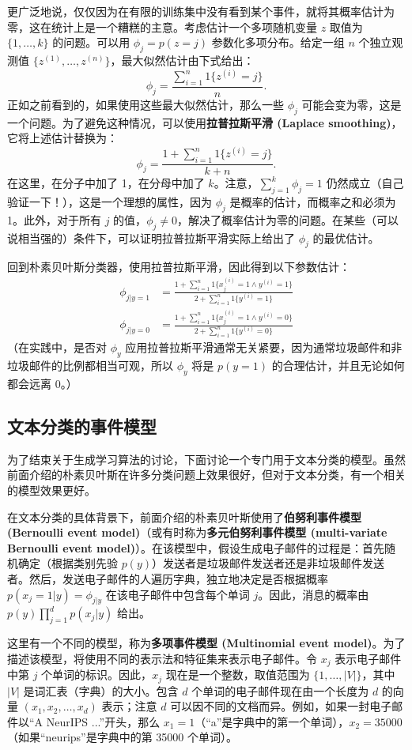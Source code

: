 更广泛地说，仅仅因为在有限的训练集中没有看到某个事件，就将其概率估计为零，这在统计上是一个糟糕的主意。考虑估计一个多项随机变量 $z$ 取值为 $\{1, \dots, k\}$ 的问题。可以用 $\phi_j = p(z=j)$ 参数化多项分布。给定一组 $n$ 个独立观测值 $\{z^{(1)}, \dots, z^{(n)}\}$，最大似然估计由下式给出：
\[
    \phi_j = \frac{\sum_{i=1}^n {1}\{z^{(i)} = j\}}{n}.
\]
正如之前看到的，如果使用这些最大似然估计，那么一些 $\phi_j$ 可能会变为零，这是一个问题。为了避免这种情况，可以使用\textbf{拉普拉斯平滑 (Laplace smoothing)}，它将上述估计替换为：
\[
    \phi_j = \frac{1 + \sum_{i=1}^n {1}\{z^{(i)} = j\}}{k + n}.
\]
在这里，在分子中加了 1，在分母中加了 $k$。注意，$\sum_{j=1}^k \phi_j = 1$ 仍然成立（自己验证一下！），这是一个理想的属性，因为 $\phi_j$ 是概率的估计，而概率之和必须为 1。此外，对于所有 $j$ 的值，$\phi_j \ne 0$，解决了概率估计为零的问题。在某些（可以说相当强的）条件下，可以证明拉普拉斯平滑实际上给出了 $\phi_j$ 的最优估计。

回到朴素贝叶斯分类器，使用拉普拉斯平滑，因此得到以下参数估计：
\begin{align*} \phi_{j|y=1} &= \frac{1 + \sum_{i=1}^n {1}\{x_j^{(i)} = 1 \wedge y^{(i)} = 1\}}{2 + \sum_{i=1}^n {1}\{y^{(i)} = 1\}} \\ \phi_{j|y=0} &= \frac{1 + \sum_{i=1}^n {1}\{x_j^{(i)} = 1 \wedge y^{(i)} = 0\}}{2 + \sum_{i=1}^n {1}\{y^{(i)} = 0\}} \end{align*}
（在实践中，是否对 $\phi_y$ 应用拉普拉斯平滑通常无关紧要，因为通常垃圾邮件和非垃圾邮件的比例都相当可观，所以 $\phi_y$ 将是 $p(y=1)$ 的合理估计，并且无论如何都会远离 0。）

\subsection{文本分类的事件模型}

为了结束关于生成学习算法的讨论，下面讨论一个专门用于文本分类的模型。虽然前面介绍的朴素贝叶斯在许多分类问题上效果很好，但对于文本分类，有一个相关的模型效果更好。

在文本分类的具体背景下，前面介绍的朴素贝叶斯使用了\textbf{伯努利事件模型 (Bernoulli event model)}（或有时称为\textbf{多元伯努利事件模型 (multi-variate Bernoulli event model)}）。在该模型中，假设生成电子邮件的过程是：首先随机确定（根据类别先验 $p(y)$）发送者是垃圾邮件发送者还是非垃圾邮件发送者。然后，发送电子邮件的人遍历字典，独立地决定是否根据概率 $p(x_j=1|y) = \phi_{j|y}$ 在该电子邮件中包含每个单词 $j$。因此，消息的概率由 $p(y) \prod_{j=1}^d p(x_j|y)$ 给出。

这里有一个不同的模型，称为\textbf{多项事件模型 (Multinomial event model)}。为了描述该模型，将使用不同的表示法和特征集来表示电子邮件。令 $x_j$ 表示电子邮件中第 $j$ 个单词的标识。因此，$x_j$ 现在是一个整数，取值范围为 $\{1, \dots, |V|\}$，其中 $|V|$ 是词汇表（字典）的大小。包含 $d$ 个单词的电子邮件现在由一个长度为 $d$ 的向量 $(x_1, x_2, \dots, x_d)$ 表示；注意 $d$ 可以因不同的文档而异。例如，如果一封电子邮件以“A NeurIPS ...”开头，那么 $x_1=1$（“a”是字典中的第一个单词），$x_2=35000$（如果“neurips”是字典中的第 35000 个单词）。

